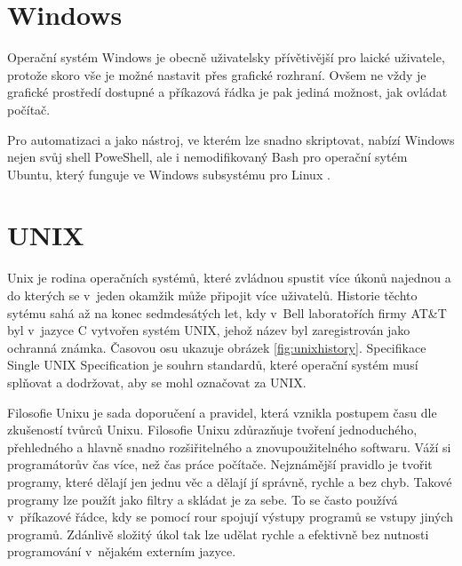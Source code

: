 \documentclass[thesis=M,czech]{FITthesis}[2012/06/26]
\begin{document}
%
\section{Windows}

Operační systém Windows \cite{windows} je obecně uživatelsky přívětivější pro laické uživatele, protože skoro vše je možné nastavit přes grafické rozhraní. Ovšem ne vždy je grafické prostředí dostupné a příkazová řádka je pak jediná možnost, jak ovládat počítač.

Pro automatizaci a jako nástroj, ve kterém lze snadno skriptovat, nabízí Windows nejen svůj shell PoweShell, ale i nemodifikovaný Bash pro operační sytém Ubuntu, který funguje ve Windows subsystému pro Linux \cite{windowscmd}.


\section{UNIX}

Unix je rodina operačních systémů, které zvládnou spustit více úkonů najednou a do kterých se v~jeden okamžik může připojit více uživatelů. Historie těchto sytému sahá až na konec sedmdesátých let, kdy v~Bell laboratořích firmy AT\&T byl v~jazyce C vytvořen systém UNIX, jehož název byl zaregistrován jako ochranná známka. Časovou osu ukazuje obrázek \ref{fig:unixhistory}. Specifikace Single UNIX Specification \cite{sus} je souhrn standardů, které operační systém musí splňovat a dodržovat, aby se mohl označovat za UNIX.

Filosofie Unixu je sada doporučení a pravidel, která vznikla postupem času dle zkušeností tvůrců Unixu. Filosofie Unixu zdůrazňuje tvoření jednoduchého, přehledného a hlavně snadno rozšiřitelného a znovupoužitelného softwaru. Váží si programátorův čas více, než čas práce počítače. Nejznámější pravidlo je tvořit programy, které dělají jen jednu věc a dělají jí správně, rychle a bez chyb. Takové programy lze použít jako filtry a skládat je za sebe. To se často používá v~příkazové řádce, kdy se pomocí rour spojují výstupy programů se vstupy jiných programů. Zdánlivě složitý úkol tak lze udělat rychle a efektivně bez nutnosti programování v~nějakém externím jazyce.
\end{document}
